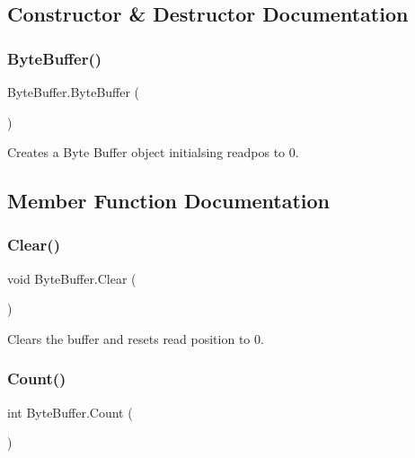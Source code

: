 \subsection{Constructor \& Destructor Documentation}
\mbox{\label{class_byte_buffer_aa1b95c150b581b8e0cf15b650e162f54}} 
\subsubsection{\texorpdfstring{ByteBuffer()}{ByteBuffer()}}
{\footnotesize\ttfamily Byte\+Buffer.\+Byte\+Buffer (\begin{DoxyParamCaption}{ }\end{DoxyParamCaption})}



Creates a Byte Buffer object initialsing readpos to 0. 



\subsection{Member Function Documentation}
\mbox{\label{class_byte_buffer_a879ab4931f4225b40611c56c9d3781f0}} 
\subsubsection{\texorpdfstring{Clear()}{Clear()}}
{\footnotesize\ttfamily void Byte\+Buffer.\+Clear (\begin{DoxyParamCaption}{ }\end{DoxyParamCaption})}



Clears the buffer and resets read position to 0. 

\mbox{\label{class_byte_buffer_ab599e90a3d53e05e8e04e2388f444873}} 
\subsubsection{\texorpdfstring{Count()}{Count()}}
{\footnotesize\ttfamily int Byte\+Buffer.\+Count (\begin{DoxyParamCaption}{ }\end{DoxyParamCaption})}



